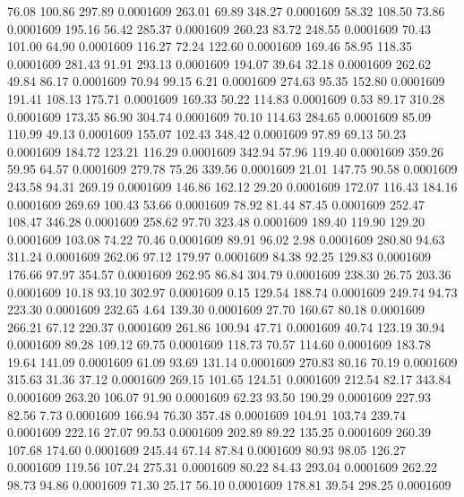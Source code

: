   76.08  100.86  297.89   0.0001609
 263.01   69.89  348.27   0.0001609
  58.32  108.50   73.86   0.0001609
 195.16   56.42  285.37   0.0001609
 260.23   83.72  248.55   0.0001609
  70.43  101.00   64.90   0.0001609
 116.27   72.24  122.60   0.0001609
 169.46   58.95  118.35   0.0001609
 281.43   91.91  293.13   0.0001609
 194.07   39.64   32.18   0.0001609
 262.62   49.84   86.17   0.0001609
  70.94   99.15    6.21   0.0001609
 274.63   95.35  152.80   0.0001609
 191.41  108.13  175.71   0.0001609
 169.33   50.22  114.83   0.0001609
   0.53   89.17  310.28   0.0001609
 173.35   86.90  304.74   0.0001609
  70.10  114.63  284.65   0.0001609
  85.09  110.99   49.13   0.0001609
 155.07  102.43  348.42   0.0001609
  97.89   69.13   50.23   0.0001609
 184.72  123.21  116.29   0.0001609
 342.94   57.96  119.40   0.0001609
 359.26   59.95   64.57   0.0001609
 279.78   75.26  339.56   0.0001609
  21.01  147.75   90.58   0.0001609
 243.58   94.31  269.19   0.0001609
 146.86  162.12   29.20   0.0001609
 172.07  116.43  184.16   0.0001609
 269.69  100.43   53.66   0.0001609
  78.92   81.44   87.45   0.0001609
 252.47  108.47  346.28   0.0001609
 258.62   97.70  323.48   0.0001609
 189.40  119.90  129.20   0.0001609
 103.08   74.22   70.46   0.0001609
  89.91   96.02    2.98   0.0001609
 280.80   94.63  311.24   0.0001609
 262.06   97.12  179.97   0.0001609
  84.38   92.25  129.83   0.0001609
 176.66   97.97  354.57   0.0001609
 262.95   86.84  304.79   0.0001609
 238.30   26.75  203.36   0.0001609
  10.18   93.10  302.97   0.0001609
   0.15  129.54  188.74   0.0001609
 249.74   94.73  223.30   0.0001609
 232.65    4.64  139.30   0.0001609
  27.70  160.67   80.18   0.0001609
 266.21   67.12  220.37   0.0001609
 261.86  100.94   47.71   0.0001609
  40.74  123.19   30.94   0.0001609
  89.28  109.12   69.75   0.0001609
 118.73   70.57  114.60   0.0001609
 183.78   19.64  141.09   0.0001609
  61.09   93.69  131.14   0.0001609
 270.83   80.16   70.19   0.0001609
 315.63   31.36   37.12   0.0001609
 269.15  101.65  124.51   0.0001609
 212.54   82.17  343.84   0.0001609
 263.20  106.07   91.90   0.0001609
  62.23   93.50  190.29   0.0001609
 227.93   82.56    7.73   0.0001609
 166.94   76.30  357.48   0.0001609
 104.91  103.74  239.74   0.0001609
 222.16   27.07   99.53   0.0001609
 202.89   89.22  135.25   0.0001609
 260.39  107.68  174.60   0.0001609
 245.44   67.14   87.84   0.0001609
  80.93   98.05  126.27   0.0001609
 119.56  107.24  275.31   0.0001609
  80.22   84.43  293.04   0.0001609
 262.22   98.73   94.86   0.0001609
  71.30   25.17   56.10   0.0001609
 178.81   39.54  298.25   0.0001609
